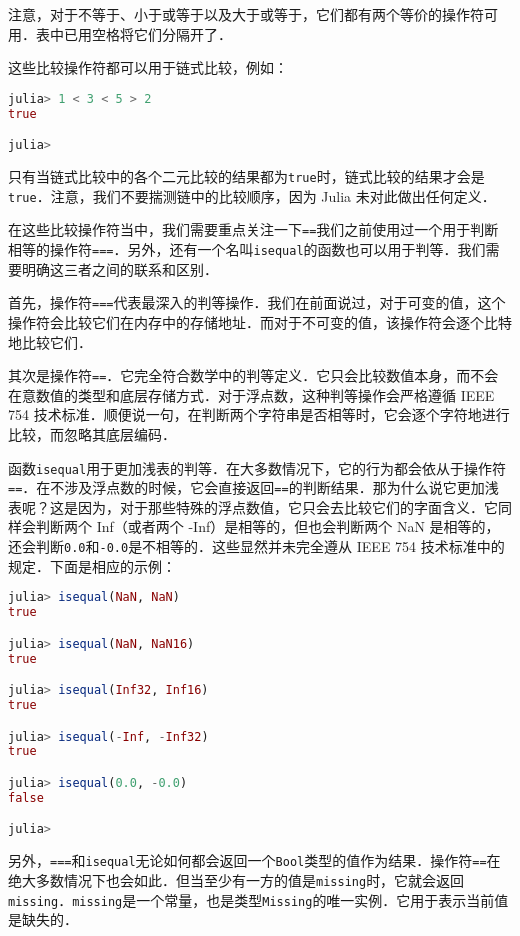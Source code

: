 注意，对于不等于、小于或等于以及大于或等于，它们都有两个等价的操作符可用．表中已用空格将它们分隔开了．

这些比较操作符都可以用于链式比较，例如：
\begin{lstlisting}[language=julia]
julia> 1 < 3 < 5 > 2
true

julia> 
\end{lstlisting}

只有当链式比较中的各个二元比较的结果都为\verb|true|时，链式比较的结果才会是\verb|true|．注意，我们不要揣测链中的比较顺序，因为 Julia 未对此做出任何定义．

在这些比较操作符当中，我们需要重点关注一下\verb|==|我们之前使用过一个用于判断相等的操作符\verb|===|．另外，还有一个名叫\verb|isequal|的函数也可以用于判等．我们需要明确这三者之间的联系和区别．

首先，操作符\verb|===|代表最深入的判等操作．我们在前面说过，对于可变的值，这个操作符会比较它们在内存中的存储地址．而对于不可变的值，该操作符会逐个比特地比较它们．

其次是操作符\verb|==|．它完全符合数学中的判等定义．它只会比较数值本身，而不会在意数值的类型和底层存储方式．对于浮点数，这种判等操作会严格遵循 IEEE 754 技术标准．顺便说一句，在判断两个字符串是否相等时，它会逐个字符地进行比较，而忽略其底层编码．

函数\verb|isequal|用于更加浅表的判等．在大多数情况下，它的行为都会依从于操作符\verb|==|．在不涉及浮点数的时候，它会直接返回\verb|==|的判断结果．那为什么说它更加浅表呢？这是因为，对于那些特殊的浮点数值，它只会去比较它们的字面含义．它同样会判断两个 Inf（或者两个 -Inf）是相等的，但也会判断两个 NaN 是相等的，还会判断\verb|0.0|和\verb|-0.0|是不相等的．这些显然并未完全遵从 IEEE 754 技术标准中的规定．下面是相应的示例：
\begin{lstlisting}[language=julia]
julia> isequal(NaN, NaN)
true

julia> isequal(NaN, NaN16)
true

julia> isequal(Inf32, Inf16)
true

julia> isequal(-Inf, -Inf32)
true

julia> isequal(0.0, -0.0)
false

julia> 
\end{lstlisting}

另外，\verb|===|和\verb|isequal|无论如何都会返回一个\verb|Bool|类型的值作为结果．操作符\verb|==|在绝大多数情况下也会如此．但当至少有一方的值是\verb|missing|时，它就会返回\verb|missing|．\verb|missing|是一个常量，也是类型\verb|Missing|的唯一实例．它用于表示当前值是缺失的．

